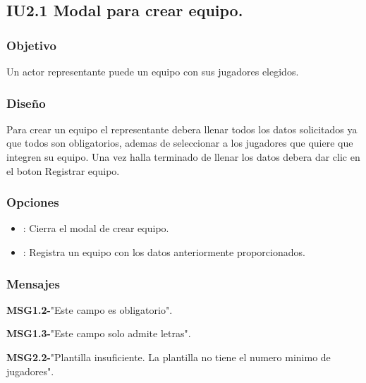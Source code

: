 
\subsection{IU2.1 Modal para crear equipo.}

\subsubsection{Objetivo}
	Un actor representante puede un equipo con sus jugadores elegidos.

\subsubsection{Diseño}
  Para crear un equipo el representante debera llenar todos los datos solicitados ya que todos son obligatorios, ademas de seleccionar a los jugadores que quiere que integren su equipo.
  Una vez halla terminado de llenar los datos debera dar clic en el boton Registrar equipo.


\subsubsection{Opciones}
\begin{itemize}
  \item {}: Cierra el modal de crear equipo.
  \item {}: Registra un equipo con los datos anteriormente proporcionados.
\end{itemize}

\subsubsection{Mensajes}
	\begin{Citemize}
		\item {\bf MSG1.2-}"Este campo es obligatorio".
				\item {\bf MSG1.3-}"Este campo solo admite letras".
				\item {\bf MSG2.2-}"Plantilla insuficiente. La plantilla no tiene el numero minimo de jugadores".
	\end{Citemize}